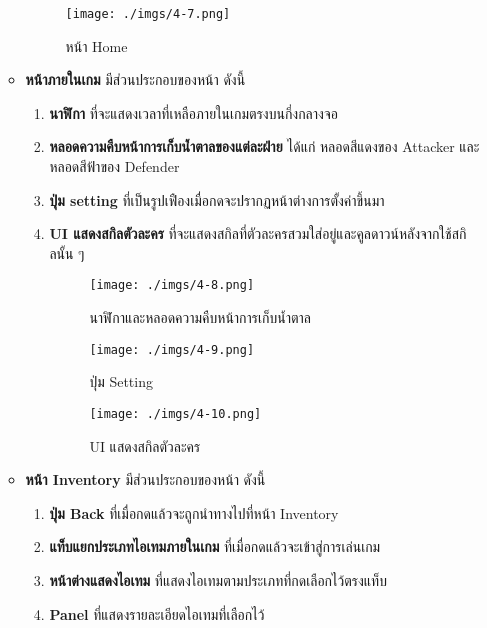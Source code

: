 \documentclass[12pt,oneside,openright,a4paper]{cpe-thai-project}
\begin{document}
\begin{enumerate}
\begin{itemize}
      \begin{figure}[H]\centering
        \texttt{[image: ./imgs/4-7.png]}
        \caption{หน้า Home}\label{fig:4-7}
      \end{figure}
      
      \pagebreak
      \item \textbf{หน้าภายในเกม} มีส่วนประกอบของหน้า ดังนี้ 
      \begin{enumerate}
        \item \textbf{นาฬิกา} ที่จะแสดงเวลาที่เหลือภายในเกมตรงบนกึ่งกลางจอ
        \item \textbf{หลอดความคืบหน้าการเก็บน้ำตาลของแต่ละฝ่าย} ได้แก่ หลอดสีแดงของ Attacker และหลอดสีฟ้าของ Defender
        \item \textbf{ปุ่ม setting} ที่เป็นรูปเฟืองเมื่อกดจะปรากฏหน้าต่างการตั้งค่าขึ้นมา
        \item \textbf{UI แสดงสกิลตัวละคร} ที่จะแสดงสกิลที่ตัวละครสวมใส่อยู่และคูลดาวน์หลังจากใช้สกิลนั้น ๆ
        
        \begin{figure}[H]\centering
            \texttt{[image: ./imgs/4-8.png]}
            \caption{นาฬิกาและหลอดความคืบหน้าการเก็บน้ำตาล}\label{fig:4-8}
          \end{figure}
          \begin{figure}[H]\centering
            \begin{minipage}{.3\textwidth}
                \centering
                \texttt{[image: ./imgs/4-9.png]}
                \caption{ปุ่ม Setting}\label{fig:4-9}
            \end{minipage}
            \begin{minipage}{.3\textwidth}
                \centering
                \texttt{[image: ./imgs/4-10.png]}
                \caption{UI แสดงสกิลตัวละคร}\label{fig:4-10}
            \end{minipage}
          \end{figure}
      \end{enumerate}         

      \item \textbf{หน้า Inventory} มีส่วนประกอบของหน้า ดังนี้ 
      \begin{enumerate}
        \item \textbf{ปุ่ม Back} ที่เมื่อกดแล้วจะถูกนำทางไปที่หน้า Inventory 
        \item \textbf{แท็บแยกประเภทไอเทมภายในเกม} ที่เมื่อกดแล้วจะเข้าสู่การเล่นเกม
        \item \textbf{หน้าต่างแสดงไอเทม} ที่แสดงไอเทมตามประเภทที่กดเลือกไว้ตรงแท็บ
        \item \textbf{Panel} ที่แสดงรายละเอียดไอเทมที่เลือกไว้
      \end{enumerate}
      

\end{itemize}
\end{enumerate}
\end{document}
